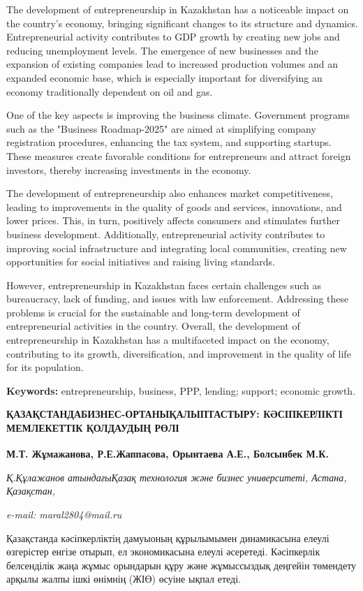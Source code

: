 The development of entrepreneurship in Kazakhstan has a noticeable
impact on the country's economy, bringing significant changes to its
structure and dynamics. Entrepreneurial activity contributes to GDP
growth by creating new jobs and reducing unemployment levels. The
emergence of new businesses and the expansion of existing companies lead
to increased production volumes and an expanded economic base, which is
especially important for diversifying an economy traditionally dependent
on oil and gas.

One of the key aspects is improving the business climate. Government
programs such as the "Business Roadmap-2025" are aimed at simplifying
company registration procedures, enhancing the tax system, and
supporting startups. These measures create favorable conditions for
entrepreneurs and attract foreign investors, thereby increasing
investments in the economy.

The development of entrepreneurship also enhances market
competitiveness, leading to improvements in the quality of goods and
services, innovations, and lower prices. This, in turn, positively
affects consumers and stimulates further business development.
Additionally, entrepreneurial activity contributes to improving social
infrastructure and integrating local communities, creating new
opportunities for social initiatives and raising living standards.

However, entrepreneurship in Kazakhstan faces certain challenges such as
bureaucracy, lack of funding, and issues with law enforcement.
Addressing these problems is crucial for the sustainable and long-term
development of entrepreneurial activities in the country. Overall, the
development of entrepreneurship in Kazakhstan has a multifaceted impact
on the economy, contributing to its growth, diversification, and
improvement in the quality of life for its population.

{\bfseries Keywords:} entrepreneurship, business, PPP, lending; support;
economic growth.

{\bfseries ҚАЗАҚСТАНДАБИЗНЕС-ОРТАНЫҚАЛЫПТАСТЫРУ: КӘСІПКЕРЛІКТІ МЕМЛЕКЕТТІК
ҚОЛДАУДЫҢ РӨЛІ}

{\bfseries М.Т. Жұмажанова\textsuperscript{\envelope }, Р.Е.Жаппасова, Орынтаева
А.Е., Болсынбек М.К.}

\emph{Қ.Құлажанов атындағыҚазақ технология және бизнес университеті,
Астана, Қазақстан,}

\emph{e-mail: maral2804@mail.ru}

Қазақстанда кәсіпкерліктің дамуыоның құрылымымен динамикасына елеулі
өзгерістер енгізе отырып, ел экономикасына елеулі әсеретеді. Кәсіпкерлік
белсенділік жаңа жұмыс орындарын құру және жұмыссыздық деңгейін
төмендету арқылы жалпы ішкі өнімнің (ЖІӨ) өсуіне ықпал етеді.

